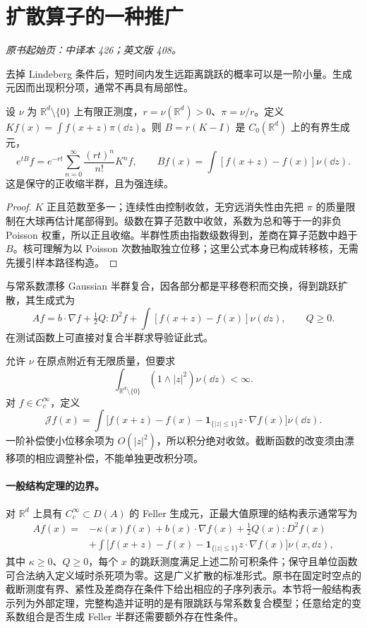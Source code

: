 \section{扩散算子的一种推广}\label{sec:yosida-13-07}
\noindent\textit{原书起始页：中译本 426；英文版 408。}

去掉 Lindeberg 条件后，短时间内发生远距离跳跃的概率可以是一阶小量。生成元因而出现积分项，通常不再具有局部性。

\begin{proposition}[有限跳跃测度的生成元]\label{prop:y13-compound-poisson}
设 $\nu$ 为 $\mathbb R^d\setminus\{0\}$ 上有限正测度，$r=\nu(\mathbb R^d)>0$、$\pi=\nu/r$。定义 $Kf(x)=\int f(x+z)\pi(\dd z)$。则 $B=r(K-I)$ 是 $C_0(\mathbb R^d)$ 上的有界生成元，
\[
 e^{tB}f=e^{-rt}\sum_{n=0}^\infty\frac{(rt)^n}{n!}K^nf,
 \qquad Bf(x)=\int[f(x+z)-f(x)]\nu(\dd z).
\]
这是保守的正收缩半群，且为强连续。
\end{proposition}
\begin{proof}
$K$ 正且范数至多一；连续性由控制收敛，无穷远消失性由先把 $\pi$ 的质量限制在大球再估计尾部得到。级数在算子范数中收敛，系数为总和等于一的非负 Poisson 权重，所以正且收缩。半群性质由指数级数得到，差商在算子范数中趋于 $B$。核可理解为以 Poisson 次数抽取独立位移；这里公式本身已构成转移核，无需先援引样本路径构造。
\end{proof}

与常系数漂移 Gaussian 半群复合，因各部分都是平移卷积而交换，得到跳跃扩散，其生成式为
\[
 Af=b\cdot\nabla f+\tfrac12Q:D^2f+
 \int[f(x+z)-f(x)]\nu(\dd z),\qquad Q\ge0.
\]
在测试函数上可直接对复合半群求导验证此式。

\begin{definition}[补偿后的跳跃项]
允许 $\nu$ 在原点附近有无限质量，但要求
\[
 \int_{\mathbb R^d\setminus\{0\}}(1\wedge|z|^2)\nu(\dd z)<\infty.
\]
对 $f\in C_c^\infty$，定义
\[
 \mathcal Jf(x)=\int\bigl[f(x+z)-f(x)-\mathbf1_{\{|z|\le1\}}z\cdot\nabla f(x)\bigr]\nu(\dd z).
\]
一阶补偿使小位移余项为 $O(|z|^2)$，所以积分绝对收敛。截断函数的改变须由漂移项的相应调整补偿，不能单独更改积分项。
\end{definition}

\paragraph{一般结构定理的边界。}
对 $\mathbb R^d$ 上具有 $C_c^\infty\subset D(A)$ 的 Feller 生成元，正最大值原理的结构表示通常写为
\begin{align*}
 Af(x)={}&-\kappa(x)f(x)+b(x)\cdot\nabla f(x)+\tfrac12Q(x):D^2f(x)\\
 &+\int\bigl[f(x+z)-f(x)-\mathbf1_{\{|z|\le1\}}z\cdot\nabla f(x)\bigr]\nu(x,\dd z),
\end{align*}
其中 $\kappa\ge0$、$Q\ge0$，每个 $x$ 的跳跃测度满足上述二阶可积条件；保守且单位函数可合法纳入定义域时杀死项为零。这是广义扩散的标准形式。原书在固定时空点的截断测度有界、紧性及差商存在条件下给出相应的子序列表示。本节将一般结构表示列为外部定理，完整构造并证明的是有限跳跃与常系数复合模型；任意给定的变系数组合是否生成 Feller 半群还需要额外存在性条件。

